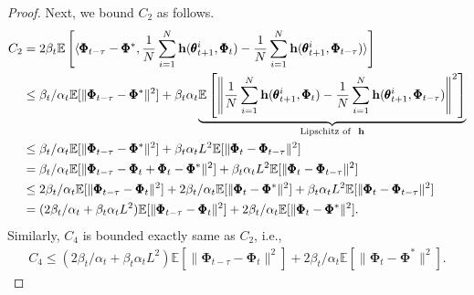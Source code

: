 \documentclass[10pt,a4paper]{amsart}
\def\bh{\mathbf{h}}
\begin{document}
\begin{proof}
Next, we bound $C_2$ as follows.
\begin{align*}
C_2&=2\beta_t\mathbb{E}\left[\langle\pmb{\Phi}_{t-\tau}-\pmb{\Phi}^*, \frac{1}{N}\sum_{i=1}^N\bh(\pmb{\theta}_{t+1}^i, \pmb{\Phi}_t)- \frac{1}{N}\sum_{i=1}^N\bh(\pmb{\theta}_{t+1}^i, \pmb{\Phi}_{t-\tau})\rangle\right]\allowdisplaybreaks\\
&\leq \beta_t/\alpha_t\mathbb{E}[\|\pmb{\Phi}_{t-\tau}-\pmb{\Phi}^*\|^2]+\beta_t\alpha_t\underset{\text{Lipschitz of }~\bh}{\underbrace{\mathbb{E}\left[\left\|\frac{1}{N}\sum_{i=1}^N\bh(\pmb{\theta}_{t+1}^i, \pmb{\Phi}_t)- \frac{1}{N}\sum_{i=1}^N\bh(\pmb{\theta}_{t+1}^i, \pmb{\Phi}_{t-\tau})\right\|^2\right]}}\allowdisplaybreaks\\
&\leq  \beta_t/\alpha_t\mathbb{E}[\|\pmb{\Phi}_{t-\tau}-\pmb{\Phi}^*\|^2]+ \beta_t\alpha_t L^2\mathbb{E}[\|\pmb{\Phi}_t-\pmb{\Phi}_{t-\tau}\|^2]\allowdisplaybreaks\\
&=  \beta_t/\alpha_t\mathbb{E}[\|\pmb{\Phi}_{t-\tau}-\pmb{\Phi}_t+\pmb{\Phi}_t-\pmb{\Phi}^*\|^2]+ \beta_t\alpha_t L^2\mathbb{E}[\|\pmb{\Phi}_t-\pmb{\Phi}_{t-\tau}\|^2]\allowdisplaybreaks\\
&\leq 2\beta_t/\alpha_t\mathbb{E}[\|\pmb{\Phi}_{t-\tau}-\pmb{\Phi}_t\|^2]+2\beta_t/\alpha_t\mathbb{E}[\|\pmb{\Phi}_t-\pmb{\Phi}^*\|^2]+ \beta_t\alpha_t L^2\mathbb{E}[\|\pmb{\Phi}_t-\pmb{\Phi}_{t-\tau}\|^2]\allowdisplaybreaks\\
&= (2\beta_t/\alpha_t+\beta_t\alpha_t L^2)\mathbb{E}[\|\pmb{\Phi}_{t-\tau}-\pmb{\Phi}_t\|^2]+2\beta_t/\alpha_t\mathbb{E}[\|\pmb{\Phi}_t-\pmb{\Phi}^*\|^2].
\end{align*}
Similarly, $C_4$ is bounded exactly same as $C_2$, i.e., 
\begin{align*}
    C_4\leq (2\beta_t/\alpha_t+\beta_t\alpha_t L^2)\mathbb{E}[\|\pmb{\Phi}_{t-\tau}-\pmb{\Phi}_t\|^2]+2\beta_t/\alpha_t\mathbb{E}[\|\pmb{\Phi}_t-\pmb{\Phi}^*\|^2].
\end{align*}


\end{proof}
\end{document}
